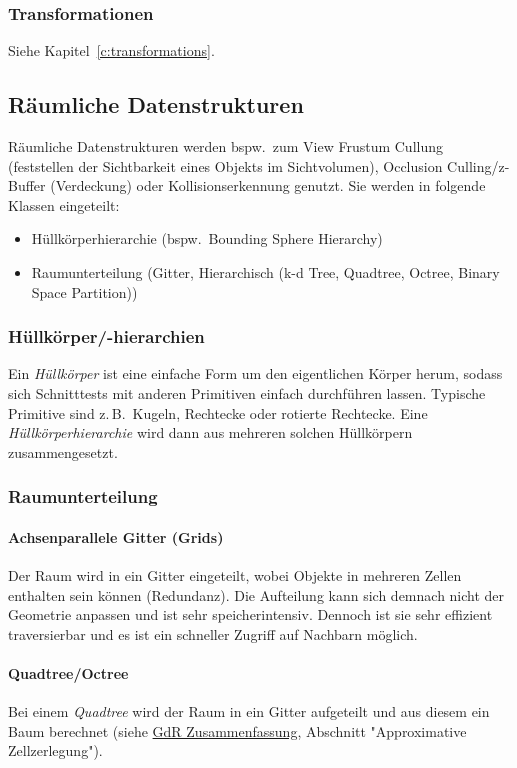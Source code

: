 \documentclass[a4paper, 11pt, accentcolor = tud3b]{tudreport}
\newcommand{\bspw}{bspw.~}
\newcommand{\zB}{z.\,B.~}
\begin{document}
				\subsubsection{Transformationen}
					Siehe Kapitel~\ref{c:transformations}.

			\subsection{Räumliche Datenstrukturen}
				Räumliche Datenstrukturen werden \bspw zum View Frustum Cullung (feststellen der Sichtbarkeit eines Objekts im Sichtvolumen), Occlusion Culling/z-Buffer (Verdeckung) oder Kollisionserkennung genutzt. Sie werden in folgende Klassen eingeteilt:
				\begin{itemize}
					\item Hüllkörperhierarchie (\bspw Bounding Sphere Hierarchy)
					\item Raumunterteilung (Gitter, Hierarchisch (k-d Tree, Quadtree, Octree, Binary Space Partition))
				\end{itemize}
	
				\subsubsection{Hüllkörper/-hierarchien}
					Ein \emph{Hüllkörper} ist eine einfache Form um den eigentlichen Körper herum, sodass sich Schnitttests mit anderen Primitiven einfach durchführen lassen. Typische Primitive sind \zB Kugeln, Rechtecke oder rotierte Rechtecke. Eine \emph{Hüllkörperhierarchie} wird dann aus mehreren solchen Hüllkörpern zusammengesetzt.
	
				\subsubsection{Raumunterteilung}
					\paragraph{Achsenparallele Gitter (Grids)}
						Der Raum wird in ein Gitter eingeteilt, wobei Objekte in mehreren Zellen enthalten sein können (Redundanz). Die Aufteilung kann sich demnach nicht der Geometrie anpassen und ist sehr speicherintensiv. Dennoch ist sie sehr effizient traversierbar und es ist ein schneller Zugriff auf Nachbarn möglich.
	
					\paragraph{Quadtree/Octree}
						Bei einem \emph{Quadtree} wird der Raum in ein Gitter aufgeteilt und aus diesem ein Baum berechnet (siehe \href{https://projects.frisp.org/documents/29}{GdR Zusammenfassung}, Abschnitt "Approximative Zellzerlegung").
						
\end{document}
